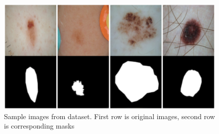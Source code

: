 \begin{figure}
    \centerline{\includegraphics[width=1\columnwidth]{04-methodology/figures/sample-images-from-dataset.png}}
    \caption{Sample images from dataset. First row is original images, second row is corresponding masks}
    \label{figure:sample-images-from-dataset}
\end{figure}